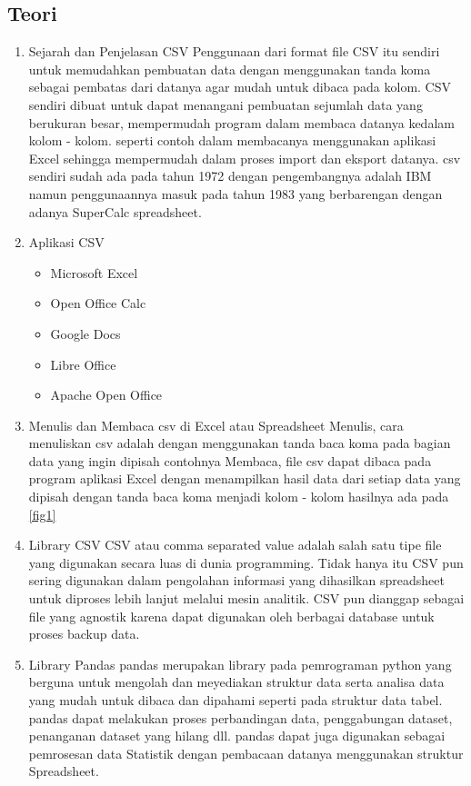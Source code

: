\subsection{Teori}
\begin{enumerate}
\item Sejarah dan Penjelasan CSV
\subitem Penggunaan dari format file CSV itu sendiri untuk memudahkan pembuatan data dengan menggunakan tanda koma sebagai pembatas dari datanya agar mudah untuk dibaca pada kolom.
\subitem CSV sendiri dibuat untuk dapat menangani pembuatan sejumlah data yang berukuran besar, mempermudah program dalam membaca datanya kedalam kolom - kolom. seperti contoh dalam membacanya menggunakan aplikasi Excel sehingga mempermudah dalam proses import dan eksport datanya. csv sendiri sudah ada pada tahun 1972 dengan pengembangnya adalah IBM namun penggunaannya masuk pada tahun 1983 yang berbarengan dengan adanya SuperCalc spreadsheet.

\item Aplikasi CSV
\begin{itemize}
\item Microsoft Excel
\item Open Office Calc
\item Google Docs
\item Libre Office
\item Apache Open Office
\end{itemize}

\item Menulis dan Membaca csv di Excel atau Spreadsheet
\subitem Menulis, cara menuliskan csv adalah dengan menggunakan tanda baca koma pada bagian data yang ingin dipisah contohnya 
\subitem Membaca, file csv dapat dibaca pada program aplikasi Excel dengan menampilkan hasil data dari setiap data yang dipisah dengan tanda baca koma menjadi kolom - kolom hasilnya ada pada \ref{fig1}

\item Library CSV
\subitem CSV atau comma separated value adalah salah satu tipe file yang digunakan secara luas di dunia programming. Tidak hanya itu CSV pun sering digunakan dalam pengolahan informasi yang dihasilkan spreadsheet untuk diproses lebih lanjut melalui mesin analitik. CSV pun dianggap sebagai file yang agnostik karena dapat digunakan oleh berbagai database untuk proses backup data.

\item Library Pandas
\subitem pandas merupakan library pada pemrograman python yang berguna untuk mengolah dan meyediakan struktur data serta analisa data yang mudah untuk dibaca dan dipahami seperti pada struktur data tabel. pandas dapat melakukan proses perbandingan data, penggabungan dataset, penanganan dataset yang hilang dll. pandas dapat juga digunakan sebagai pemrosesan data Statistik dengan pembacaan datanya menggunakan struktur Spreadsheet.


\end{enumerate}
